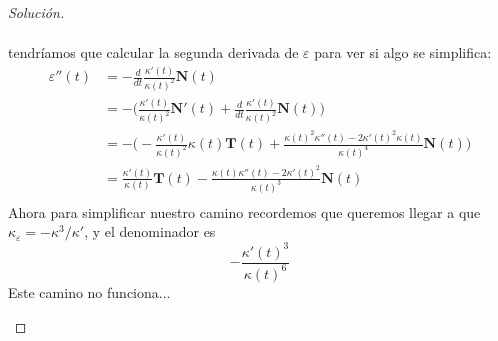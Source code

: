 \documentclass[spanish]{book}
\theoremstyle{definition}
\begin{document}
\begin{proof}[Solución]
\begin{enumerate}
\begin{align*}
		\end{align*}
		tendríamos que calcular la segunda derivada de $\varepsilon$ para ver si algo se simplifica:
		\begin{align*}
			\varepsilon''(t)&=-\frac{d}{dt}\frac{\kappa'(t)}{\kappa(t)^2}\mathbf{N}(t)\\
			&=-\Big(\frac{\kappa'(t)}{\kappa(t)^2}\mathbf{N}'(t)+\frac{d}{dt}\frac{\kappa'(t)}{\kappa(t)^2}\mathbf{N}(t)\Big)\\
			&=-\Big(-\frac{\kappa'(t)}{\kappa(t)^2}\kappa(t)\mathbf{T}(t)+\frac{\kappa(t)^2\kappa''(t)-2\kappa'(t)^2\kappa(t)}{\kappa(t)^4}\mathbf{N}(t)\Big)\\
			&=\frac{\kappa'(t)}{\kappa(t)}\mathbf{T}(t)-\frac{\kappa(t)\kappa''(t)-2\kappa'(t)^2}{\kappa(t)^3}\mathbf{N}(t)\\
		\end{align*}
		Ahora para simplificar nuestro camino recordemos que queremos llegar a que $\kappa_\varepsilon=-\kappa^3/\kappa'$, y el denominador es
		\[-\frac{\kappa'(t)^3}{\kappa(t)^6}\]
		Este camino no funciona...
		

\end{enumerate}
\end{proof}
\end{document}
